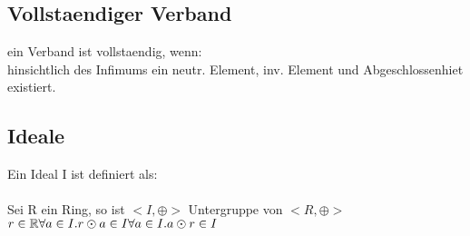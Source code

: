 \documentclass{article}
\begin{document}
\subsection{Vollstaendiger Verband}
ein Verband ist vollstaendig, wenn:\\
hinsichtlich des Infimums ein neutr. Element, inv. Element und Abgeschlossenhiet existiert.\\
\subsection{Ideale}
Ein Ideal I ist definiert als:\\
\\
Sei R ein Ring, so ist $<I,\oplus>$ Untergruppe von $<R, \oplus>$\\
$
r \in \mathbb{R}
\forall a \in I. 
        r \odot a \in I\\
\forall a \in I.
        a \odot r \in I\\
$
\end{document}
